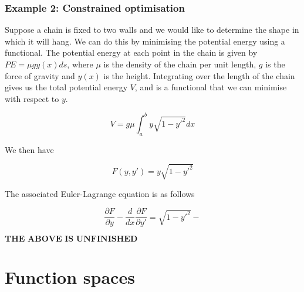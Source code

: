\documentclass[]{article}
\begin{document}
\subsubsection{Example 2: Constrained optimisation}
Suppose a chain is fixed to two walls and we would like to determine the shape in which it will hang. We can do this by minimising the potential energy using a functional. The potential energy at each point in the chain is given by $PE = \mu gy(x) ds$, where $\mu$ is the density of the chain per unit length, $g$ is the force of gravity and $y(x)$ is the height. Integrating over the length of the chain gives us the total potential energy $V$, and is a functional that we can minimise with respect to $y$.

\begin{equation} V = g \mu \int_{a}^{b} y\sqrt{1-y'^{2}}dx \end{equation}

We then have

\begin{equation} F(y, y') = y\sqrt{1-y'^{2}}\end{equation}

The associated Euler-Lagrange equation is as follows

\begin{equation} \frac{\partial F}{\partial y} - \frac{d}{dx}\frac{\partial F}{\partial y'} = \sqrt{1-y'^{2}} -  \end{equation}

$\textbf{THE ABOVE IS UNFINISHED}$

\nocite{*}



\newpage
\section{Function spaces}
\end{document}

